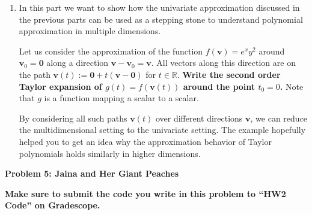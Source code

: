 \documentclass{article}\usepackage[utf8]{inputenc}\usepackage[margin=0.4cm,top=0.4cm,bottom=0.4cm]{geometry}\usepackage[usenames,dvipsnames,svgnames,table]{xcolor}
\begin{document}
\begin{enumerate}
\EndSolution
\item In this part we want to show how the univariate approximation discussed in the previous parts can be used as a stepping stone to understand polynomial approximation in multiple dimensions.
\vspace{4pt}

Let us consider the approximation of the function $f(\mathbf{v}) = e^x y^2$ around $\mathbf{v}_0 = \mathbf{0}$ along a direction $\mathbf{v} - \mathbf{v}_0 = \mathbf{v}$. All vectors along this direction are on the path $\mathbf{v}(t) := \mathbf{0}+ t(\mathbf{v}-\mathbf{0})$ for $t\in \mathbb{R}$. \textbf{Write the second order Taylor expansion of $g(t) = f(\mathbf{v}(t))$ around the point $t_0=0$.} Note that $g$ is a function mapping a scalar to a scalar.
\vspace{4pt}

By considering all such paths $\mathbf{v}(t)$ over different directions $\mathbf{v}$, we can reduce the multidimensional setting to the univariate setting. The example hopefully helped you to get an idea why the approximation behavior of Taylor polynomials holds similarly in higher dimensions.
\BeginSolution

\EndSolution
\end{enumerate}
\clearpage

\vspace{-2mm}\noindent\begin{mybox}{\begin{center}\textbf{\color{black}Problem 5: Jaina and Her Giant Peaches}\end{center}}\end{mybox}\vspace{-2mm}
\vspace{10pt}
\noindent \textbf{Make sure to submit the code you write in this problem to ``HW2 Code'' on Gradescope.}
\vspace{4pt}
\end{document}
